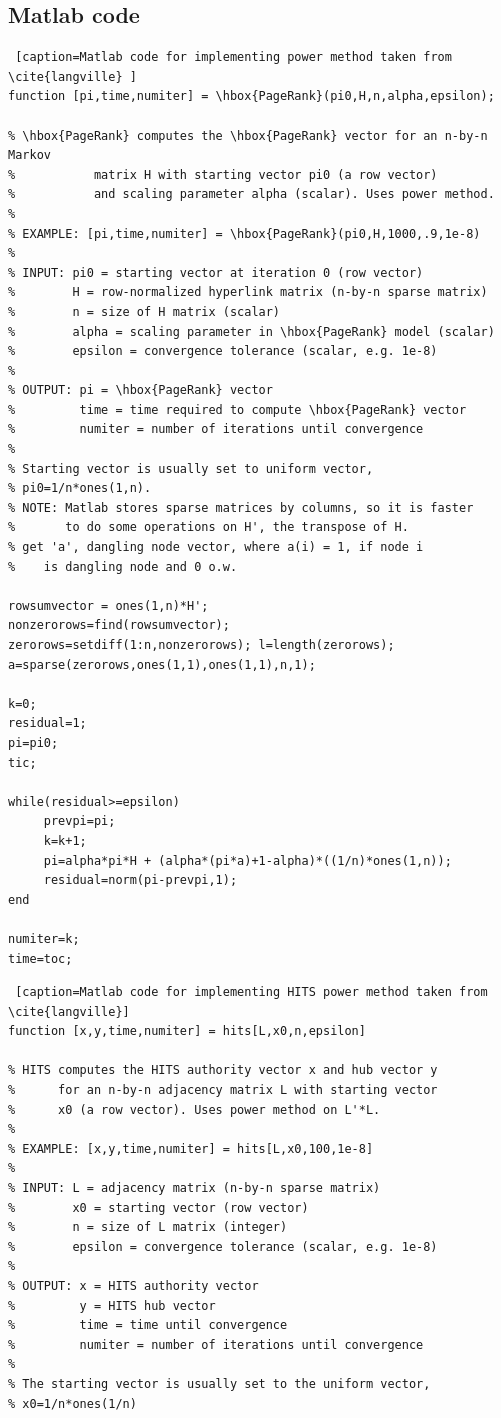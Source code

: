\documentclass[11pt]{report}
\begin{document}
\begin{appendices}
\chapter{Matlab code} \label{app:code}

\begin{lstlisting} [caption=Matlab code for implementing power method taken from \cite{langville} ]
function [pi,time,numiter] = \hbox{PageRank}(pi0,H,n,alpha,epsilon);

% \hbox{PageRank} computes the \hbox{PageRank} vector for an n-by-n Markov
%           matrix H with starting vector pi0 (a row vector)
%           and scaling parameter alpha (scalar). Uses power method.
%
% EXAMPLE: [pi,time,numiter] = \hbox{PageRank}(pi0,H,1000,.9,1e-8)
%
% INPUT: pi0 = starting vector at iteration 0 (row vector)
%        H = row-normalized hyperlink matrix (n-by-n sparse matrix)
%        n = size of H matrix (scalar)
%        alpha = scaling parameter in \hbox{PageRank} model (scalar)
%        epsilon = convergence tolerance (scalar, e.g. 1e-8)
%
% OUTPUT: pi = \hbox{PageRank} vector
%         time = time required to compute \hbox{PageRank} vector
%         numiter = number of iterations until convergence
%        
% Starting vector is usually set to uniform vector,
% pi0=1/n*ones(1,n).
% NOTE: Matlab stores sparse matrices by columns, so it is faster
%       to do some operations on H', the transpose of H.
% get 'a', dangling node vector, where a(i) = 1, if node i 
%    is dangling node and 0 o.w.

rowsumvector = ones(1,n)*H';
nonzerorows=find(rowsumvector);
zerorows=setdiff(1:n,nonzerorows); l=length(zerorows);
a=sparse(zerorows,ones(1,1),ones(1,1),n,1);

k=0;
residual=1;
pi=pi0;
tic;

while(residual>=epsilon)
     prevpi=pi;
     k=k+1;
     pi=alpha*pi*H + (alpha*(pi*a)+1-alpha)*((1/n)*ones(1,n));
     residual=norm(pi-prevpi,1);
end

numiter=k;
time=toc;

\end{lstlisting}

\begin{lstlisting} [caption=Matlab code for implementing HITS power method taken from \cite{langville}]
function [x,y,time,numiter] = hits[L,x0,n,epsilon] 

% HITS computes the HITS authority vector x and hub vector y 
%      for an n-by-n adjacency matrix L with starting vector
%      x0 (a row vector). Uses power method on L'*L.
%
% EXAMPLE: [x,y,time,numiter] = hits[L,x0,100,1e-8]
%
% INPUT: L = adjacency matrix (n-by-n sparse matrix)
%        x0 = starting vector (row vector)
%        n = size of L matrix (integer)
%        epsilon = convergence tolerance (scalar, e.g. 1e-8)
%
% OUTPUT: x = HITS authority vector
%         y = HITS hub vector
%         time = time until convergence
%         numiter = number of iterations until convergence
%        
% The starting vector is usually set to the uniform vector,
% x0=1/n*ones(1/n)


\end{lstlisting}
\end{appendices}
\end{document}

